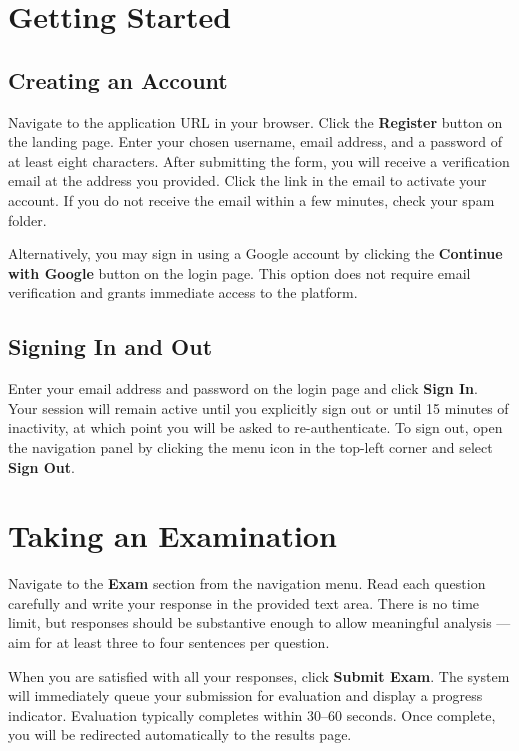 \documentclass[12pt, a4paper]{report}
\begin{document}
\section{Getting Started}

\subsection{Creating an Account}

Navigate to the application URL in your browser. Click the \textbf{Register} button on the landing page. Enter your chosen username, email address, and a password of at least eight characters. After submitting the form, you will receive a verification email at the address you provided. Click the link in the email to activate your account. If you do not receive the email within a few minutes, check your spam folder.

Alternatively, you may sign in using a Google account by clicking the \textbf{Continue with Google} button on the login page. This option does not require email verification and grants immediate access to the platform.

\subsection{Signing In and Out}

Enter your email address and password on the login page and click \textbf{Sign In}. Your session will remain active until you explicitly sign out or until 15 minutes of inactivity, at which point you will be asked to re-authenticate. To sign out, open the navigation panel by clicking the menu icon in the top-left corner and select \textbf{Sign Out}.

\section{Taking an Examination}

Navigate to the \textbf{Exam} section from the navigation menu. Read each question carefully and write your response in the provided text area. There is no time limit, but responses should be substantive enough to allow meaningful analysis — aim for at least three to four sentences per question.

When you are satisfied with all your responses, click \textbf{Submit Exam}. The system will immediately queue your submission for evaluation and display a progress indicator. Evaluation typically completes within 30--60 seconds. Once complete, you will be redirected automatically to the results page.
\end{document}
